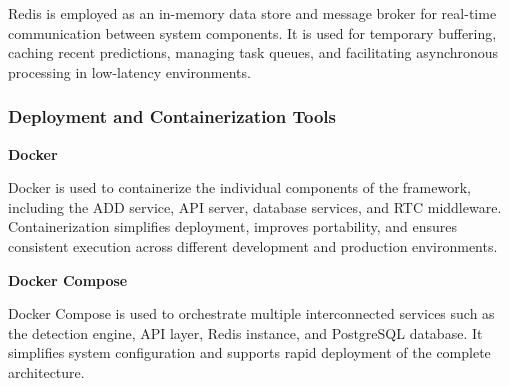Redis is employed as an in-memory data store and message broker for real-time communication between system components. It is used for temporary buffering, caching recent predictions, managing task queues, and facilitating asynchronous processing in low-latency environments.


\subsubsection{Deployment and Containerization Tools}
\vspace{0.5cm}
\textbf{Docker}

Docker is used to containerize the individual components of the framework, including the ADD service, API server, database services, and RTC middleware. Containerization simplifies deployment, improves portability, and ensures consistent execution across different development and production environments.

\textbf{Docker Compose}

Docker Compose is used to orchestrate multiple interconnected services such as the detection engine, API layer, Redis instance, and PostgreSQL database. It simplifies system configuration and supports rapid deployment of the complete architecture.
